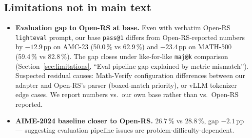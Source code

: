 \subsection{Limitations not in main text}
\begin{itemize}\itemsep0pt
\item \textbf{Evaluation gap to Open-RS at base.} Even with verbatim Open-RS
\texttt{lighteval} prompt, our base \texttt{pass@1} differs from
Open-RS-reported numbers by $-12.9$\,pp on AMC-23 (50.0\,\% vs 62.9\,\%) and
$-23.4$\,pp on MATH-500 (59.4\,\% vs 82.8\,\%). The gap closes under
like-for-like \texttt{maj@k} comparison
(Section~\ref{sec:limitations}, ``Eval pipeline gap explained by metric
mismatch''). Suspected residual causes: Math-Verify configuration differences
between our adapter and Open-RS's parser (boxed-match priority), or vLLM
tokenizer edge cases. We report numbers vs.\ our own base rather than vs.\
Open-RS reported.
\item \textbf{AIME-2024 baseline closer to Open-RS.} $26.7$\,\% vs $28.8$\,\%,
gap $-2.1$\,pp --- suggesting evaluation pipeline issues are
problem-difficulty-dependent.
\end{itemize}
